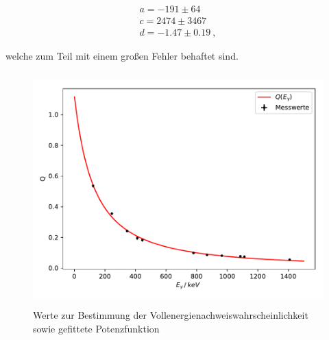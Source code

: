 \begin{align*}
  a = -191 \pm 64\\
  c = 2474 \pm 3467\\
  d = -1.47 \pm 0.19\:,
\end{align*}

welche zum Teil mit einem großen Fehler behaftet sind.
\begin{figure}
  \centering
  \includegraphics[height=9cm]{plot4.pdf}
  \caption{Werte zur Bestimmung der Vollenergienachweiswahrscheinlichkeit sowie gefittete Potenzfunktion}
  \label{fig:plot4}
\end{figure}

